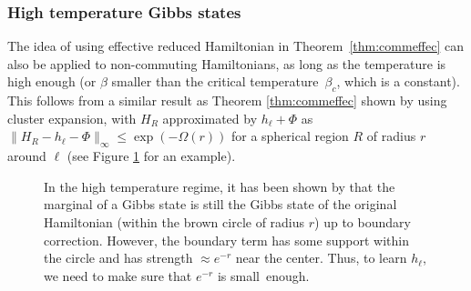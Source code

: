 \documentclass[11pt]{article}
\begin{document}
\subsubsection{High temperature Gibbs states}
The idea of using effective reduced Hamiltonian in Theorem~\ref{thm:commeffec} can also be applied to non-commuting Hamiltonians, as long as the temperature is high enough (or $\beta$ smaller than the critical temperature~$\beta_c$, which is a constant). This follows from a similar result as Theorem \ref{thm:commeffec} shown by \cite{KKB20} using cluster expansion, with $H_R$ approximated by $h_\ell+\Phi$ as $\|H_R-h_{\ell}-\Phi\|_\infty\leq \exp(-\Omega(r))$ for a spherical region $R$ of radius $r$ around $\ell$ (see Figure \ref{fig:noncommeff} for an example).

\begin{figure}
\centering
{}
\caption{In the high temperature regime, it has been shown by \cite{KKB20} that the marginal of a Gibbs state is still the Gibbs state of the original Hamiltonian (within the brown circle of radius $r$) up to  boundary correction. However, the boundary term has some support within the circle and has strength $\approx e^{-r}$ near the center. Thus, to learn $h_\ell$, we need to make sure that $e^{-r}$ is small~enough.}
\label{fig:noncommeff}
\end{figure}
\end{document}
